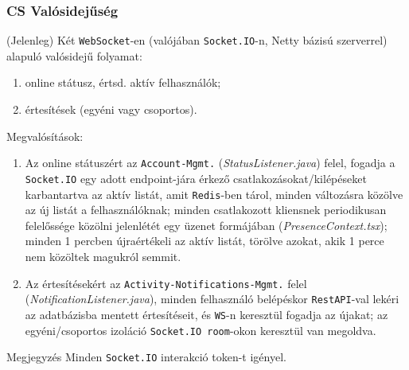 \begin{frame}
    \frametitle{CS Valósidejűség}

    (Jelenleg) Két \texttt{WebSocket}-en (valójában \texttt{Socket.IO}-n, Netty bázisú szerverrel) alapuló valósidejű folyamat:
    \begin{enumerate}
        \item online státusz, értsd. aktív felhasználók;
        \item értesítések (egyéni vagy csoportos).
    \end{enumerate}

    Megvalósítások:
    \begin{enumerate}
        \item Az online státuszért az \texttt{Account-Mgmt.} (\textit{StatusListener.java}) felel, fogadja a \texttt{Socket.IO} egy adott endpoint-jára érkező csatlakozásokat/kilépéseket karbantartva az aktív listát, amit \texttt{Redis}-ben tárol, minden változásra közölve az új listát a felhasználóknak; minden csatlakozott kliensnek periodikusan felelőssége közölni jelenlétét egy üzenet formájában (\textit{PresenceContext.tsx}); minden 1 percben újraértékeli az aktív listát, törölve azokat, akik 1 perce nem közöltek magukról semmit.
        \item Az értesítésekért az \texttt{Activity-Notifications-Mgmt.} felel (\textit{NotificationListener.java}), minden felhasználó belépéskor \texttt{RestAPI}-val lekéri az adatbázisba mentett értesítéseit, és \texttt{WS}-n keresztül fogadja az újakat; az egyéni/csoportos izoláció \texttt{Socket.IO room}-okon keresztül van megoldva.
    \end{enumerate}

    \begin{block}{Megjegyzés}
        Minden \texttt{Socket.IO} interakció token-t igényel.
    \end{block}
\end{frame}